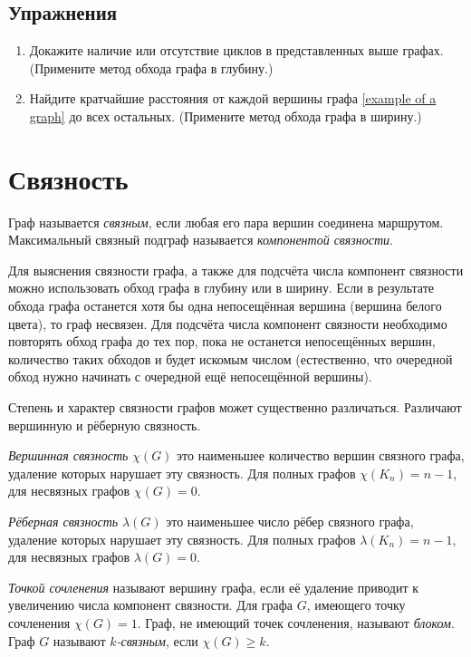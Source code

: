 \subsection{Упражнения}

\begin{enumerate}
	\item Докажите наличие или отсутствие циклов в представленных выше графах. (Примените метод обхода графа в глубину.)
	
	\item Найдите кратчайшие расстояния от каждой вершины графа \ref{example of a graph} до всех остальных. (Примените метод обхода графа в ширину.)
\end{enumerate}

\section{Связность}

Граф называется \emph{связным}, если любая его пара вершин соединена маршрутом.
Максимальный связный подграф называется \emph{компонентой связности}.

Для выяснения связности графа, а также для подсчёта числа компонент связности 
можно использовать обход графа в глубину или в ширину. Если в результате обхода 
графа останется хотя бы одна непосещённая вершина (вершина белого цвета), то 
граф несвязен. Для подсчёта числа компонент связности необходимо повторять 
обход графа до тех пор, пока не останется непосещённых вершин, количество таких 
обходов и будет искомым числом (естественно, что очередной обход нужно начинать 
с очередной ещё непосещённой вершины).

Степень и характер связности графов может существенно различаться. Различают
вершинную и рёберную связность.

\emph{Вершинная связность} $\chi(G)$ это наименьшее количество вершин связного 
графа, удаление которых нарушает эту связность. Для полных графов 
$\chi(K_n)=n-1$, для несвязных графов $\chi(G)=0$.

\emph{Рёберная связность} $\lambda(G)$ это наименьшее число рёбер связного 
графа, удаление которых нарушает эту связность. Для полных графов 
$\lambda(K_n)=n-1$, для несвязных графов $\lambda(G)=0$.

\emph{Точкой сочленения} называют вершину графа, если её удаление приводит к 
увеличению числа компонент связности. Для графа $G$, имеющего точку сочленения 
$\chi(G)=1$. Граф, не имеющий точек сочленения, называют \emph{блоком}. Граф 
$G$ называют \emph{$k$-связным}, если $\chi(G)\geq k$.

